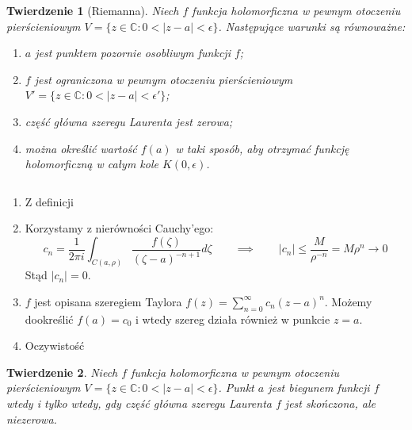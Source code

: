 \documentclass[11pt]{article}
\newcommand{\abs}[1]{\left|#1\right|} %
\theoremstyle{plain}
\newtheorem*{theorem}{Twierdzenie}
\theoremstyle{definition}
\theoremstyle{remark}
\let\oldendproof\endproof
\renewenvironment{proof}[1][\proofname]{
  \oldproof[\textsc{\small #1}]
}{\oldendproof}
\begin{document}
\begin{theorem}[Riemanna]
  Niech $f$ funkcja holomorficzna w pewnym otoczeniu pierścieniowym $ V = \{ z \in \mathbb{C}: 0 < \abs{z-a} < \epsilon \} $.
  Następujące warunki są równoważne:

  \begin{enumerate}
    \item $ a $ jest punktem pozornie osobliwym funkcji $ f $; \label{tw-riemanna-poz}
    \item $ f $ jest ograniczona w pewnym otoczeniu pierścieniowym  $ V' = \{ z \in \mathbb{C}: 0 < \abs{z-a} < \epsilon' \} $; \label{tw-riemanna-ogr}
    \item część główna szeregu Laurenta jest zerowa; \label{tw-riemanna-gl-zerowa}
    \item można określić wartość $ f(a) $ w taki sposób, aby otrzymać funkcję holomorficzną w całym kole $ K(0, \epsilon) $. \label{tw-riemanna-dookreslenie}
  \end{enumerate}
\end{theorem}

\begin{proof}
  $ $
  \begin{enumerate}[leftmargin=5.1em]
    \item[\ref{tw-riemanna-poz} $ \Rightarrow $ \ref{tw-riemanna-ogr}]
    Z definicji

    \item[\ref{tw-riemanna-ogr} $ \Rightarrow $ \ref{tw-riemanna-gl-zerowa}]
    Korzystamy z nierówności Cauchy’ego:
    $$
      c_{n} =  \frac{1}{2 \pi i} \int_{C(a, \rho)} \frac{f(\zeta)}{(\zeta-a)^{-n+1}} d\zeta
      \qquad\implies\qquad
      \abs{ c_n } \leq \frac{M}{\rho^{-n}} = M\rho^n \to 0
    $$
    Stąd $ \abs{c_n} = 0 $.

    \item[\ref{tw-riemanna-gl-zerowa} $ \Rightarrow $ \ref{tw-riemanna-dookreslenie}]
    $ f $ jest opisana szeregiem Taylora $ f(z) = \sum_{n=0}^{\infty} c_n(z-a)^n $.
    Możemy dookreślić $ f(a) = c_0 $ i wtedy szereg działa również w punkcie $ z = a $.

    \item[\ref{tw-riemanna-dookreslenie} $ \Rightarrow $ \ref{tw-riemanna-poz}]
    Oczywistość
  \end{enumerate}
\end{proof}

\begin{theorem}
  Niech $f$ funkcja holomorficzna w pewnym otoczeniu pierścieniowym $ V = \{ z \in \mathbb{C}: 0 < \abs{z-a} < \epsilon \} $.
  Punkt $a$ jest biegunem funkcji $f$ wtedy i tylko wtedy,
  gdy część główna szeregu Laurenta $ f $ jest skończona, ale niezerowa.
\end{theorem}
\end{document}
